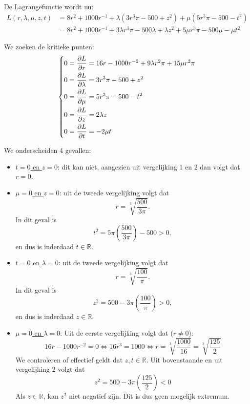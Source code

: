 \documentclass[kulak]{kulakarticle} %
\newcommand{\R}{\mathbb{R}} %
\begin{document}
\begin{enumerate}
	De Lagrangefunctie wordt nu:
	\begin{align*}
	L(r,\lambda,\mu,z,t) &= 8r^2 + 1000r^{-1} + \lambda (3r^3\pi - 500 + z^2) + \mu (5r^3\pi - 500 - t^2) \\
						&= 8r^2 + 1000r^{-1} + 3\lambda r^3\pi - 500\lambda + \lambda z^2 + 5\mu r^3\pi - 500\mu - \mu t^2
	\end{align*}

	We zoeken de kritieke punten:
	\begin{align*}
		\begin{dcases}
			0 = \displaystyle\frac{\partial L}{\partial r} = 16r-1000r^{-2}+9\lambda r^2\pi + 15 \mu r^2 \pi \\
			0 = \displaystyle\frac{\partial L}{\partial \lambda} = 3r^3\pi - 500 + z^2 \\
			0 = \displaystyle\frac{\partial L}{\partial \mu} = 5r^3\pi - 500 - t^2 \\
			0 = \displaystyle\frac{\partial L}{\partial z} = 2\lambda z \\
			0 = \displaystyle\frac{\partial L}{\partial t} = -2\mu t
		\end{dcases}
	\end{align*}

	We onderscheiden 4 gevallen:
	\begin{itemize}
		\item \underline{\(t=0\) en \(z=0\)}: dit kan niet, aangezien uit vergelijking 1 en 2 dan volgt dat \(r=0\).
		\item \underline{\(\mu=0\) en \(z=0\)}: uit de tweede vergelijking volgt dat \[r=\sqrt[3]{\frac{500}{3\pi}}.\]
		In dit geval is \[t^2=5\pi\left(\frac{500}{3\pi}\right)-500>0,\] en dus is inderdaad \(t \in \R\).
		\item \underline{\(t=0\) en \(\lambda=0\)}: uit de tweede vergelijking volgt dat \[r=\sqrt[3]{\frac{100}{\pi}}.\]
		In dit geval is \[z^2=500-3\pi\left(\frac{100}{\pi}\right)>0,\] en dus is inderdaad \(z \in \R\).
		\newpage
		\item \underline{\(\mu=0\) en \(\lambda=0\)}:
		Uit de eerste vergelijking volgt dat (\(r\neq 0\)):
		\[16r-1000r^{-2} = 0 \Leftrightarrow 16r^3=1000 \Leftrightarrow r = \sqrt[3]{\frac{1000}{16}}=\sqrt[3]{\frac{125}{2}}\]
		We controleren of effectief geldt dat \(z,t \in \R\). Uit bovenstaande en uit vergelijking 2 volgt dat
		\[z^2=500-3\pi \left( \frac{125}{2} \right) < 0\]
		Als \(z\in\R\), kan \(z^2\) niet negatief zijn. Dit is dus geen mogelijk extremum.
	\end{itemize}


\end{enumerate}
\end{document}
